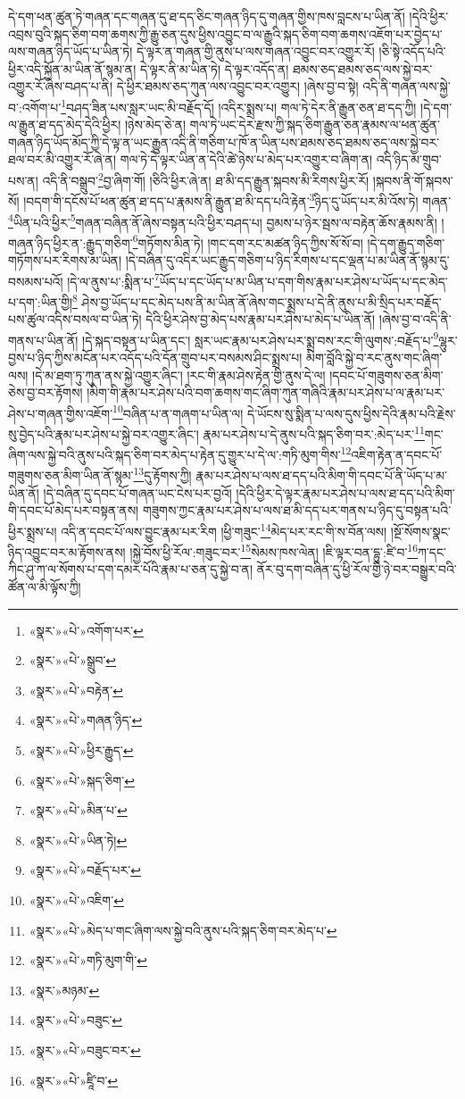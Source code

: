 དེ་དག་ཕན་ཚུན་ཏེ་གཞན་དང་གཞན་དུ་ཐ་དད་ཅིང་གཞན་ཉིད་དུ་གཞན་གྱིས་ཁས་བླངས་པ་ཡིན་ནོ། །དེའི་ཕྱིར་འབྲས་བུའི་སྐད་ཅིག་བག་ཆགས་ཀྱི་རྒྱུ་ཅན་དུས་ཕྱིས་འབྱུང་བ་ལ་རྒྱུའི་སྐད་ཅིག་བག་ཆགས་འཇོག་པར་བྱེད་པ་ལས་གཞན་ཉིད་ཡོད་པ་ཡིན་ཏེ། དེ་ལྟར་ན་གཞན་གྱི་ནུས་པ་ལས་གཞན་འབྱུང་བར་འགྱུར་རོ། །ཅི་སྟེ་འདོད་པའི་ཕྱིར་འདི་སྐྱོན་མ་ཡིན་ནོ་སྙམ་ན། དེ་ལྟར་ནི་མ་ཡིན་ཏེ། དེ་ལྟར་འདོད་ན། ཐམས་ཅད་ཐམས་ཅད་ལས་སྐྱེ་བར་འགྱུར་རོ་ཞེས་བཤད་པ་ནི། དེ་ཕྱིར་ཐམས་ཅད་ཀུན་ལས་འབྱུང་བར་འགྱུར། །ཞེས་བྱ་བ་སྟེ། འདི་ནི་གཞན་ལས་སྐྱེ་བ་:འགོག་པ་\footnote{«སྣར་»«པེ་»འགོག་པར་}བཤད་ཟིན་པས་སླར་ཡང་མི་བརྗོད་དོ། །འདིར་སྨྲས་པ། གལ་ཏེ་དེར་ནི་རྒྱུན་ཅན་ཐ་དད་ཀྱི། །དེ་དག་ལ་རྒྱུན་ཐ་དད་མེད་དེའི་ཕྱིར། །ཉེས་མེད་ཅེ་ན། གལ་ཏེ་ཡང་དེར་རྫས་ཀྱི་སྐད་ཅིག་རྒྱུན་ཅན་རྣམས་ལ་ཕན་ཚུན་གཞན་ཉིད་ཡོད་མོད་ཀྱི་དེ་ལྟ་ན་ཡང་རྒྱུན་འདི་ནི་གཅིག་པ་ཁོ་ན་ཡིན་པས་ཐམས་ཅད་ཐམས་ཅད་ལས་སྐྱེ་བར་ཐལ་བར་མི་འགྱུར་རོ་ཞེ་ན། གལ་ཏེ་དེ་ལྟར་ཡིན་ན་དེའི་ཚེ་ཉེས་པ་མེད་པར་འགྱུར་བ་ཞིག་ན། འདི་ཉིད་མ་གྲུབ་པས་ན། འདི་ནི་བསྒྲུབ་\footnote{«སྣར་»«པེ་»སྒྲུབ་}བྱ་ཞིག་གོ། །ཅིའི་ཕྱིར་ཞེ་ན། ཐ་མི་དད་རྒྱུན་སྐབས་མི་རིགས་ཕྱིར་རོ། །སྐབས་ནི་གོ་སྐབས་སོ། །བདག་གི་དངོས་པོ་ཕན་ཚུན་ཐ་དད་པ་རྣམས་ནི་རྒྱུན་ཐ་མི་དད་པའི་རྟེན་\footnote{«སྣར་»«པེ་»བརྟེན་}ཉིད་དུ་ཡོད་པར་མི་འོས་ཏེ། གཞན་\footnote{«སྣར་»«པེ་»གཞན་ཉིད་}ཡིན་པའི་ཕྱིར་\footnote{«སྣར་»«པེ་»ཕྱིར་རྒྱུད་}གཞན་བཞིན་ནོ་ཞེས་བསྟན་པའི་ཕྱིར་བཤད་པ། བྱམས་པ་ཉེར་སྦས་ལ་བརྟེན་ཆོས་རྣམས་ནི། །གཞན་ཉིད་ཕྱིར་ན་:རྒྱུད་གཅིག་\footnote{«སྣར་»«པེ་»སྐད་ཅིག་}གཏོགས་མིན་ཏེ། །གང་དག་རང་མཚན་ཉིད་ཀྱིས་སོ་སོ་བ། །དེ་དག་རྒྱུད་གཅིག་གཏོགས་པར་རིགས་མ་ཡིན། །དེ་བཞིན་དུ་འདིར་ཡང་རྒྱུད་གཅིག་པ་ཉིད་རིགས་པ་དང་ལྡན་པ་མ་ཡིན་ནོ་སྙམ་དུ་བསམས་པའོ། །དེ་ལ་ནུས་པ་:སྨིན་པ་\footnote{«སྣར་»«པེ་»མིན་པ་}ཡོད་པ་དང་ཡོད་པ་མ་ཡིན་པ་དག་གིས་རྣམ་པར་ཤེས་པ་ཡོད་པ་དང་མེད་པ་དག་:ཡིན་གྱི།\footnote{«སྣར་»«པེ་»ཡིན་ཏེ།} ཤེས་བྱ་ཡོད་པ་དང་མེད་པས་ནི་མ་ཡིན་ནོ་ཞེས་གང་སྨྲས་པ་དེ་ནི་ནུས་པ་མི་སྲིད་པར་བརྗོད་པས་ཚུལ་འདིས་བསལ་བ་ཡིན་ཏེ། དེའི་ཕྱིར་ཤེས་བྱ་མེད་པས་རྣམ་པར་ཤེས་པ་མེད་པ་ཡིན་ནོ། །ཞེས་བྱ་བ་འདི་ནི་གནས་པ་ཡིན་ནོ། །དེ་སྐད་བསྟན་པ་ཡིན་དང་། སླར་ཡང་རྣམ་པར་ཤེས་པར་སྨྲ་བས་རང་གི་ལུགས་:བརྗོད་པ་\footnote{«སྣར་»«པེ་»བརྗོད་པར་}ལྷུར་བྱས་པ་ཉིད་ཀྱིས་མངོན་པར་འདོད་པའི་དོན་གྲུབ་པར་བསམས་ཤིང་སྨྲས་པ། མིག་བློའི་སྐྱེ་བ་རང་ནུས་གང་ཞིག་ལས། །དེ་མ་ཐག་ཏུ་ཀུན་ནས་སྐྱེ་འགྱུར་ཞིང་། །རང་གི་རྣམ་ཤེས་རྟེན་གྱི་ནུས་དེ་ལ། །དབང་པོ་གཟུགས་ཅན་མིག་ཅེས་བྱ་བར་རྟོགས། །མིག་གི་རྣམ་པར་ཤེས་པའི་བག་ཆགས་གང་ཞིག་ཀུན་གཞིའི་རྣམ་པར་ཤེས་པ་ལ་རྣམ་པར་ཤེས་པ་གཞན་གྱིས་འཇོག་\footnote{«སྣར་»«པེ་»འཇིག་}བཞིན་པ་ན་གཞག་པ་ཡིན་ལ། དེ་ཡོངས་སུ་སྨིན་པ་ལས་དུས་ཕྱིས་དེའི་རྣམ་པའི་རྗེས་སུ་བྱེད་པའི་རྣམ་པར་ཤེས་པ་སྐྱེ་བར་འགྱུར་ཞིང་། རྣམ་པར་ཤེས་པ་དེ་ནུས་པའི་སྐད་ཅིག་བར་:མེད་པར་\footnote{«སྣར་»«པེ་»མེད་པ་གང་ཞིག་ལས་སྐྱེ་བའི་ནུས་པའི་སྐད་ཅིག་བར་མེད་པ་}གང་ཞིག་ལས་སྐྱེ་བའི་ནུས་པའི་སྐད་ཅིག་བར་མེད་པ་རྟེན་དུ་གྱུར་པ་དེ་ལ་:གཏི་མུག་གིས་\footnote{«སྣར་»«པེ་»གཏི་མུག་གི་}འཇིག་རྟེན་ན་དབང་པོ་གཟུགས་ཅན་མིག་ཡིན་ནོ་སྙམ་\footnote{«སྣར་»མཉམ་}དུ་རྟོགས་ཀྱི། རྣམ་པར་ཤེས་པ་ལས་ཐ་དད་པའི་མིག་གི་དབང་པོ་ནི་ཡོད་པ་མ་ཡིན་ནོ། །དེ་བཞིན་དུ་དབང་པོ་གཞན་ཡང་ངེས་པར་བྱའོ། །དེའི་ཕྱིར་དེ་ལྟར་རྣམ་པར་ཤེས་པ་ལས་ཐ་དད་པའི་མིག་གི་དབང་པོ་མེད་པར་བསྟན་ནས། གཟུགས་ཀྱང་རྣམ་པར་ཤེས་པ་ལས་ཐ་མི་དད་པར་གནས་པ་ཉིད་དུ་བསྟན་པའི་ཕྱིར་སྨྲས་པ། འདི་ན་དབང་པོ་ལས་བྱུང་རྣམ་པར་རིག །ཕྱི་གཟུང་\footnote{«སྣར་»«པེ་»བཟུང་}མེད་པར་རང་གི་ས་བོན་ལས། །སྔོ་སོགས་སྣང་ཉིད་འབྱུང་བར་མ་རྟོགས་ནས། །སྐྱེ་བོས་ཕྱི་རོལ་:གཟུང་བར་\footnote{«སྣར་»«པེ་»བཟུང་བར་}སེམས་ཁས་ལེན། །ཇི་ལྟར་བན་དྷུ་:ཛི་བ་\footnote{«སྣར་»«པེ་»ཛཱི་བ་}ཀ་དང་ཀིང་ཤུ་ཀ་ལ་སོགས་པ་དག་དམར་པོའི་རྣམ་པ་ཅན་དུ་སྐྱེ་བ་ན། ནོར་བུ་དག་བཞིན་དུ་ཕྱི་རོལ་གྱི་ཉེ་བར་བསྒྱུར་བའི་ཚོན་ལ་མི་ལྟོས་ཀྱི། 